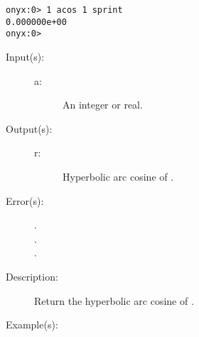 \begin{description}
\begin{description}
\begin{verbatim}
onyx:0> 1 acos 1 sprint
0.000000e+00
onyx:0>
		\end{verbatim}
	\end{description}
\label{systemdict:acosh}
\item[{\onyxop{a}{acosh}{r}}: ]
	\begin{description}\item[]
	\item[Input(s): ]
		\begin{description}\item[]
		\item[a: ]
			An integer or real.
		\end{description}
	\item[Output(s): ]
		\begin{description}\item[]
		\item[r: ]
			Hyperbolic arc cosine of .
		\end{description}
	\item[Error(s): ]
		\begin{description}\item[]
		\item[.]
		\item[.]
		\item[.]
		\end{description}
	\item[Description: ]
		Return the hyperbolic arc cosine of .
	\item[Example(s): ]\begin{verbatim}


\end{verbatim}
\end{description}
\end{description}
